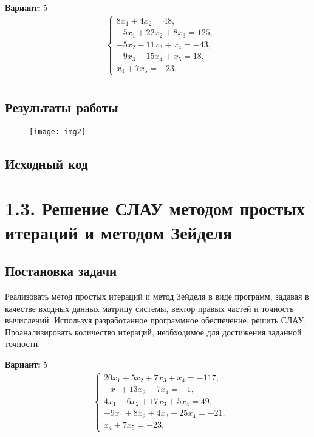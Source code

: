 {\bfseries Вариант:} 5
\begin{align*}
& \begin{cases}
8x_1 + 4x_2 = 48,\\
-5x_1 + 22x_2 + 8x_3 = 125,\\
-5x_2 - 11x_3 + x_4 = -43,\\
-9x_3 - 15x_4 + x_5 = 18, \\
x_4 + 7x_5 = -23.
\end{cases} \\
\end{align*}

\subsection{Результаты работы}
\begin{figure}[h!]
\raggedright
\texttt{[image: img2]}
\end{figure}
\pagebreak

\subsection{Исходный код}

\pagebreak

\section* {1.3. Решение СЛАУ методом простых итераций и методом Зейделя}

\setcounter{subsection}{0}

\subsection{Постановка задачи}
Реализовать метод простых итераций и метод Зейделя в виде программ, задавая в качестве входных данных матрицу системы, вектор правых частей и точность вычислений. Используя разработанное программное обеспечение, решить СЛАУ. Проанализировать количество итераций, необходимое для достижения заданной точности.    

{\bfseries Вариант:} 5
\begin{align*}
& \begin{cases}
20x_1 + 5x_2 + 7x_3 + x_4 = -117,\\
-x_1 + 13x_2 - 7x_4 = -1,\\
4x_1 - 6x_2 + 17x_3 + 5x_4 = 49,\\
-9x_1 + 8x_2 + 4x_3 - 25x_4 = -21, \\
x_4 + 7x_5 = -23.
\end{cases} \\
\end{align*}

